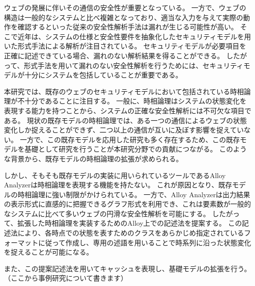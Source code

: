 \documentclass[12pt,a4paper]{jbook}
\begin{document}
ウェブの発展に伴いその通信の安全性が重要となっている。
一方で、ウェブの構造は一般的なシステムと比べ複雑となっており、適当な入力を与えて実際の動作を確認するといった従来の安全性解析手法は漏れが生じる可能性が高い。
そこで近年は、システムの仕様と安全性要件を抽象化したセキュリティモデルを用いた形式手法による解析が注目されている。
セキュリティモデルが必要項目を正確に記述できている場合、漏れのない解析結果を得ることができる。
したがって、形式手法を用いて漏れのない安全性解析を行うためには、セキュリティモデルが十分にシステムを包括していることが重要である。

本研究では、既存のウェブのセキュリティモデルにおいて包括されている時相論理が不十分であることに注目する。
一般に、時相論理はシステムの状態変化を表現する能力を持つことから、システムの正確な安全性解析には不可欠な項目である。
現状の既存モデルの時相論理では、ある一つの通信によるウェブの状態変化しか捉えることができず、二つ以上の通信が互いに及ぼす影響を捉えていない。
一方で、この既存モデルを応用した研究も多く存在するため、この既存モデルを基礎として研究を行うことが本研究分野での貢献につながる。
このような背景から、既存モデルの時相論理の拡張が求められる。

しかし、そもそも既存モデルの実装に用いられているツールであるAlloy Analyzerは時相論理を表現する機能を持たない。
これが原因となり、既存モデルの時相論理に強い制限がかけられている。
一方で、Alloy Analyzerは出力結果の表示形式に直感的に把握できるグラフ形式を利用でき、これは要素数が一般的なシステムに比べて多いウェブの円滑な安全性解析を可能にする。
したがって、拡張した時相論理を実装するためのAlloy上での記述法を提案する。
この記述法により、各時点での状態を表すためのクラスをあらかじめ指定されているフォーマットに従って作成し、専用の述語を用いることで時系列に沿った状態変化を捉えることが可能になる。

また、この提案記述法を用いてキャッシュを表現し、基礎モデルの拡張を行う。
\\（ここから事例研究について書きます）
\end{document}
